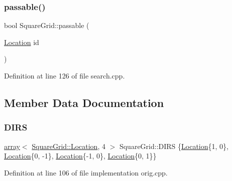 \subsubsection{\texorpdfstring{passable()}{passable()}\hspace{0.1cm}{\footnotesize\ttfamily [2/2]}}
{\footnotesize\ttfamily bool Square\+Grid\+::passable (\begin{DoxyParamCaption}\item[{\mbox{\hyperlink{struct_square_grid_a2c9a2cbd3912aa48ac97289abc3f1c0f}{Location}}}]{id }\end{DoxyParamCaption})\hspace{0.3cm}{\ttfamily [inline]}}



Definition at line 126 of file search.\+cpp.



\subsection{Member Data Documentation}
\mbox{\label{struct_square_grid_aac91cba6573640c545485ed054089c87}} 
\subsubsection{\texorpdfstring{D\+I\+RS}{DIRS}}
{\footnotesize\ttfamily \mbox{\hyperlink{glad_8h_a52f38e7d822a46377fde7a02708eedb1}{array}}$<$ \mbox{\hyperlink{struct_square_grid_a2c9a2cbd3912aa48ac97289abc3f1c0f}{Square\+Grid\+::\+Location}}, 4 $>$ Square\+Grid\+::\+D\+I\+RS \{\mbox{\hyperlink{struct_square_grid_a2c9a2cbd3912aa48ac97289abc3f1c0f}{Location}}\{1, 0\}, \mbox{\hyperlink{struct_square_grid_a2c9a2cbd3912aa48ac97289abc3f1c0f}{Location}}\{0, -\/1\}, \mbox{\hyperlink{struct_square_grid_a2c9a2cbd3912aa48ac97289abc3f1c0f}{Location}}\{-\/1, 0\}, \mbox{\hyperlink{struct_square_grid_a2c9a2cbd3912aa48ac97289abc3f1c0f}{Location}}\{0, 1\}\}\hspace{0.3cm}{\ttfamily [static]}}



Definition at line 106 of file implementation orig.\+cpp.

\mbox{\label{struct_square_grid_ad6b113fc3a49f5db5fbf9c8138e35634}} 
